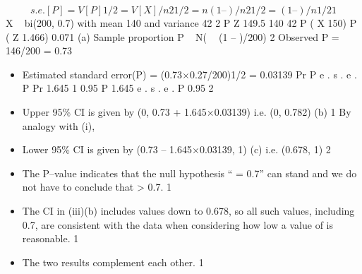 \documentclass[a4paper,12pt]{article}
\begin{document}
\[s.e.[P] = {V[P]}1/2 = {V[X]/n 2}1/2 = {n (1 – )/n 2 }1/2 = { (1 – )/n}1/2 1\]
X ~ bi(200, 0.7) with mean 140 and variance 42 2
P Z
149.5 140
42
P ( X 150)
P ( Z
1.466) 0.071
(a) Sample proportion P ~ N(  (1 – )/200)
2
Observed P = 146/200 = 0.73
\begin{itemize}
\item Estimated standard error(P) = (0.73×0.27/200)1/2 = 0.03139
Pr
P
e . s . e . P
Pr
1.645
1
0.95
P 1.645 e . s . e . P
0.95
2
\item Upper 95\% CI is given by (0, 0.73 + 1.645×0.03139)
i.e. (0, 0.782)
(b)
1
By analogy with (i),
\item Lower 95\% CI is given by (0.73 – 1.645×0.03139, 1)
(c)
i.e. (0.678, 1)  2
\item The P–value indicates that the null hypothesis “ = 0.7” can stand and we do not have to conclude that > 0.7. 1
\item The CI in (iii)(b) includes values down to 0.678, so all such values, including 0.7, are consistent with the data when considering how low a value of is reasonable. 1
\item The two results complement each other. 1

\end{itemize}
\end{document}
